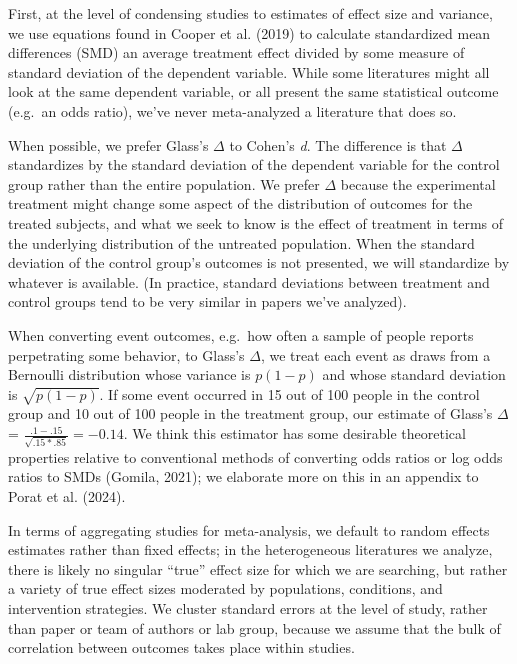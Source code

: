 \documentclass[
  ,jou]{apa6}
\begin{document}
First, at the level of condensing studies to estimates of effect size and variance, we use equations found in Cooper et al. (2019) to calculate standardized mean differences (SMD) \textemdash an average treatment effect divided by some measure of standard deviation of the dependent variable. While some literatures might all look at the same dependent variable, or all present the same statistical outcome (e.g.~an odds ratio), we've never meta-analyzed a literature that does so.

When possible, we prefer Glass's \(\Delta\) to Cohen's \emph{d}. The difference is that \(\Delta\) standardizes by the standard deviation of the dependent variable for the control group rather than the entire population. We prefer \(\Delta\) because the experimental treatment might change some aspect of the distribution of outcomes for the treated subjects, and what we seek to know is the effect of treatment in terms of the underlying distribution of the untreated population. When the standard deviation of the control group's outcomes is not presented, we will standardize by whatever is available. (In practice, standard deviations between treatment and control groups tend to be very similar in papers we've analyzed).

When converting event outcomes, e.g.~how often a sample of people reports perpetrating some behavior, to Glass's \(\Delta\), we treat each event as draws from a Bernoulli distribution whose variance is \(p (1-p)\) and whose standard deviation is \(\sqrt{p(1-p)}\). If some event occurred in 15 out of 100 people in the control group and 10 out of 100 people in the treatment group, our estimate of Glass's \(\Delta\) = \(\frac{.1 - .15}{\sqrt{.15 * .85}} = -0.14\). We think this estimator has some desirable theoretical properties relative to conventional methods of converting odds ratios or log odds ratios to SMDs (Gomila, 2021); we elaborate more on this in an appendix to Porat et al. (2024).

In terms of aggregating studies for meta-analysis, we default to random effects estimates rather than fixed effects; in the heterogeneous literatures we analyze, there is likely no singular ``true'' effect size for which we are searching, but rather a variety of true effect sizes moderated by populations, conditions, and intervention strategies. We cluster standard errors at the level of study, rather than paper or team of authors or lab group, because we assume that the bulk of correlation between outcomes takes place within studies.
\end{document}
